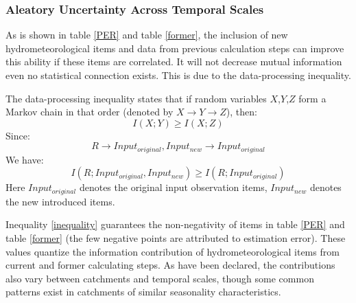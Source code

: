 \documentclass[draft,wrr]{AGUTeX}
\begin{document}
\begin{article}
\subsubsection{Aleatory Uncertainty Across Temporal Scales}
As is shown in table \ref{PER} and table \ref{former}, the inclusion of new hydrometeorological items and data from previous calculation steps can improve this ability if these items are correlated. It will not decrease mutual information even no statistical connection exists. This is due to the data-processing inequality\citep{cover2012elements}.  

The data-processing inequality states that if random variables $X$,$Y$,$Z$ form a Markov chain in that order (denoted by $X \rightarrow Y \rightarrow Z$), then:
\begin{equation}
I(X;Y) \geq I(X;Z)
\end{equation}
Since:
\begin{equation}
R \rightarrow Input_{original},Input_{new} \rightarrow Input_{original}
\end{equation} 
We have:
\begin{equation}
\label{inequality}
I(R;Input_{original},Input_{new}) \geq I(R;Input_{original})
\end{equation}
Here $Input_{original}$ denotes the original input observation items, $Input_{new}$ denotes the new introduced items.  

Inequality \ref{inequality} guarantees the non-negativity of items in table \ref{PER} and table \ref{former} (the few negative points are attributed to estimation error).  
These values quantize the information contribution of  hydrometeorological items from current and former calculating steps. As have been declared, the contributions also vary between catchments and temporal scales, though some common patterns exist in catchments of similar seasonality characteristics.





\end{article}
\end{document}
